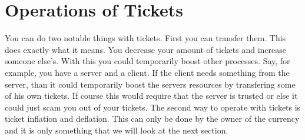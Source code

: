 \section{Operations of Tickets}

You can do two notable things with tickets. First you can transfer them. 
This does exactly what it means. You decrease your amount of tickets and increase someone else's. 
With this you could temporarily boost other processes.
Say, for example, you have a server and a client.
If the client needs something from the server, than it could temporarily boost the servers resources by transfering some of his own tickets.
If course this would require that the server is trusted or else it could just scam you out of your tickets.
The second way to operate with tickets is ticket inflation and deflation. This can only be done by the owner of the currency and it is only something that we will look at the next section.